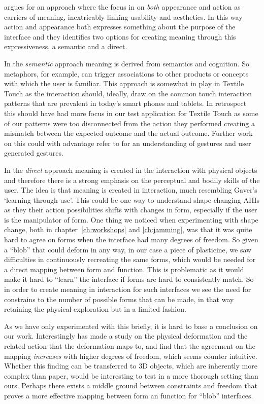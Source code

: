 \citeauthor{djajadiningrat2004tangible} argues for an approach where the focus in on \emph{both} appearance and action as carriers of meaning, inextricably linking usability and aesthetics.
In this way action and appearance both expresses something about the purpose of the interface and they identifies two options for creating meaning through this expressiveness, a semantic and a direct.

In the \emph{semantic} approach meaning is derived from semantics and cognition.
So metaphors, for example, can trigger associations to other products or concepts with which the user is familiar.
This approach is somewhat in play in Textile Touch as the interaction should, ideally, draw on the common touch interaction patterns that are prevalent in today's smart phones and tablets.
In retrospect this should have had more focus in our test application for Textile Touch as some of our patterns were too disconnected from the action they performed creating a mismatch between the expected outcome and the actual outcome.
Further work on this could with advantage refer to \citep{wobbrock2009user,morris2010understanding} for an understanding of gestures and user generated gestures.

In the \emph{direct} approach meaning is created in the interaction with physical objects and therefore there is a strong emphasis on the perceptual and bodily skills of the user.
The idea is that meaning is created in interaction, much resembling Gaver's `learning through use'. 
This could be one way to understand shape changing AHIs as they their action possibilities shifts with changes in form, especially if the user is the manipulator of form.
One thing we noticed when experimenting with shape change, both in chapter~\ref{ch:workshops} and \ref{ch:jamming}, was that it was quite hard to agree on forms when the interface had many degrees of freedom.
So given a ``blob'' that could deform in any way, in our case a piece of plasticine, we saw difficulties in continuously recreating the same forms, which would be needed for a direct mapping between form and function.
This is problematic as it would make it hard to ``learn'' the interface if forms are hard to consistently match.
So in order to create meaning in interaction for such interfaces we see the need for constrains to the number of possible forms that can be made, in that way retaining the physical exploration but in a limited fashion.

As we have only experimented with this briefly, it is hard to base a conclusion on our work.
Interestingly \citet{lee2010users} has made a study on the physical deformation and the related action that the deformation maps to, and find that the agreement on the mapping \emph{increases} with higher degrees of freedom, which seems counter intuitive.
Whether this finding can be transferred to 3D objects, which are inherently more complex than paper, would be interesting to test in a more thorough setting than ours.
Perhaps there exists a middle ground between constraints and freedom that proves a more effective mapping between form an function for ``blob'' interfaces.
\blank

